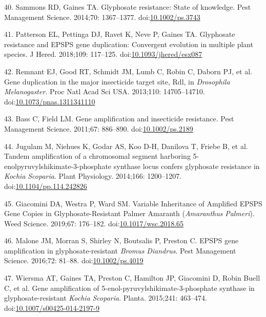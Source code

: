 \documentclass[10pt,letterpaper]{article}
\begin{document}
\leavevmode\hypertarget{ref-sammons_glyphosate_2014}{}%
40. Sammons RD, Gaines TA. Glyphosate resistance: State of knowledge.
Pest Management Science. 2014;70: 1367--1377.
doi:\href{https://doi.org/10.1002/ps.3743}{10.1002/ps.3743}

\leavevmode\hypertarget{ref-patterson_glyphosate_2018}{}%
41. Patterson EL, Pettinga DJ, Ravet K, Neve P, Gaines TA. Glyphosate
resistance and EPSPS gene duplication: Convergent evolution in multiple
plant species. J Hered. 2018;109: 117--125.
doi:\href{https://doi.org/10.1093/jhered/esx087}{10.1093/jhered/esx087}

\leavevmode\hypertarget{ref-remnant_gene_2013}{}%
42. Remnant EJ, Good RT, Schmidt JM, Lumb C, Robin C, Daborn PJ, et al.
Gene duplication in the major insecticide target site, Rdl, in
\emph{Drosophila} \emph{Melanogaster}. Proc Natl Acad Sci USA. 2013;110:
14705--14710.
doi:\href{https://doi.org/10.1073/pnas.1311341110}{10.1073/pnas.1311341110}

\leavevmode\hypertarget{ref-bass_gene_2011}{}%
43. Bass C, Field LM. Gene amplification and insecticide resistance.
Pest Management Science. 2011;67: 886--890.
doi:\href{https://doi.org/10.1002/ps.2189}{10.1002/ps.2189}

\leavevmode\hypertarget{ref-jugulam_tandem_2014}{}%
44. Jugulam M, Niehues K, Godar AS, Koo D-H, Danilova T, Friebe B, et
al. Tandem amplification of a chromosomal segment harboring
5-enolpyruvylshikimate-3-phosphate synthase locus confers glyphosate
resistance in \emph{Kochia} \emph{Scoparia}. Plant Physiology. 2014;166:
1200--1207.
doi:\href{https://doi.org/10.1104/pp.114.242826}{10.1104/pp.114.242826}

\leavevmode\hypertarget{ref-giacomini_variable_2019}{}%
45. Giacomini DA, Westra P, Ward SM. Variable Inheritance of Amplified
EPSPS Gene Copies in Glyphosate-Resistant Palmer Amaranth
(\emph{Amaranthus} \emph{Palmeri}). Weed Science. 2019;67: 176--182.
doi:\href{https://doi.org/10.1017/wsc.2018.65}{10.1017/wsc.2018.65}

\leavevmode\hypertarget{ref-malone_epsps_2016}{}%
46. Malone JM, Morran S, Shirley N, Boutsalis P, Preston C. EPSPS gene
amplification in glyphosate-resistant \emph{Bromus} \emph{Diandrus}.
Pest Management Science. 2016;72: 81--88.
doi:\href{https://doi.org/10.1002/ps.4019}{10.1002/ps.4019}

\leavevmode\hypertarget{ref-wiersma_gene_2015}{}%
47. Wiersma AT, Gaines TA, Preston C, Hamilton JP, Giacomini D, Robin
Buell C, et al. Gene amplification of
5-enol-pyruvylshikimate-3-phosphate synthase in glyphosate-resistant
\emph{Kochia} \emph{Scoparia}. Planta. 2015;241: 463--474.
doi:\href{https://doi.org/10.1007/s00425-014-2197-9}{10.1007/s00425-014-2197-9}
\end{document}
